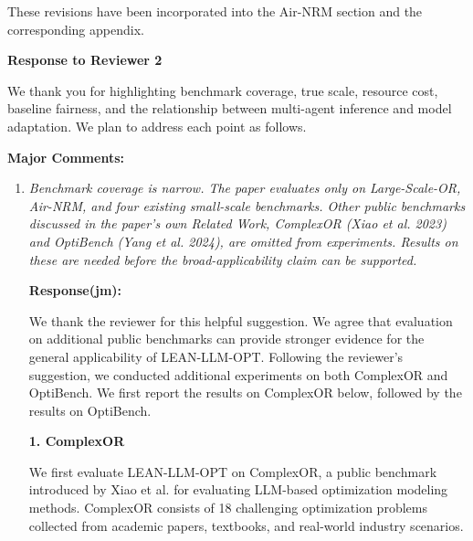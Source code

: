 \documentclass[11pt]{article}
\newcommand{\edit}[1]{{\color{hopkins-blue}\itshape #1}}
\newcommand{\planned}{\noindent\underline{\textbf{Planned response}}:\ }
\newcommand{\expected}{\noindent\textbf{Expected outputs.} }
\begin{document}
\begin{enumerate}[label=(AssoE.\arabic*),leftmargin=*]
\begin{enumerate}[label=(R1.Major.\arabic*),leftmargin=*]
These revisions have been incorporated into the Air-NRM section and the corresponding appendix.

\end{enumerate}

\newpage
\begin{center}
{\LARGE\textbf{Response to Reviewer 2}}
\end{center}

We thank you for highlighting benchmark coverage, true scale, resource cost, baseline fairness, and the relationship between multi-agent inference and model adaptation. We plan to address each point as follows.

\noindent\textbf{Major Comments:}

\begin{enumerate}[label=(R2.Major.\arabic*),leftmargin=*]

\item \edit{Benchmark coverage is narrow. The paper evaluates only on Large-Scale-OR, Air-NRM, and four existing small-scale benchmarks. Other public benchmarks discussed in the paper's own Related Work, ComplexOR (Xiao et al. 2023) and OptiBench (Yang et al. 2024), are omitted from experiments. Results on these are needed before the broad-applicability claim can be supported.}\label{R2-major-1}



\textbf{Response(jm):}

We thank the reviewer for this helpful suggestion. We agree that evaluation on additional public benchmarks can provide stronger evidence for the general applicability of LEAN-LLM-OPT. Following the reviewer's suggestion, we conducted additional experiments on both ComplexOR and OptiBench. We first report the results on ComplexOR below, followed by the results on OptiBench.

\medskip
\noindent
\textbf{1. ComplexOR}

We first evaluate LEAN-LLM-OPT on ComplexOR, a public benchmark introduced by Xiao et al. \citep{xiao2024chain} for evaluating LLM-based optimization modeling methods. ComplexOR consists of 18 challenging optimization problems collected from academic papers, textbooks, and real-world industry scenarios.


\end{enumerate}
\end{enumerate}
\end{document}
